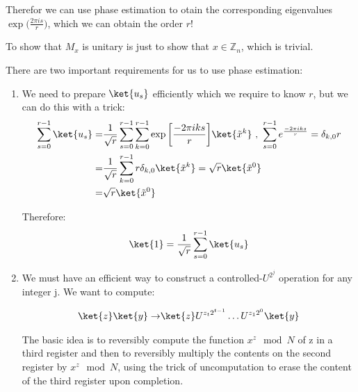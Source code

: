 Therefor we can use phase estimation to otain the corresponding eigenvalues $\exp \big( \frac{2\pi i s}{r} \big)$, which we can obtain the order $r$!

To show that $M_x$ is unitary is just to show that $x \in \mathbb{Z}_n$, which is trivial.

There are two important requirements for us to use phase estimation:
\begin{enumerate}
    \item We need to prepare $\ket{u_s}$ efficiently which we require to know $r$, but we can do this with a trick:
    \begin{equation*}
    \begin{split}
        \sum_{s=0}^{r-1} \ket{u_s} = & \frac{1}{\sqrt{r}} \sum_{s=0}^{r-1} \sum_{k=0}^{r-1} \exp \bigg[ \frac{- 2 \pi i k s}{r} \bigg] \ket{\Tilde{x}^k} \ , \ \sum_{s=0}^{r-1} e^{\frac{-2\pi i k s}{r}} = \delta_{k,0} r \\
        = & \frac{1}{\sqrt{r}} \sum_{k=0}^{r-1} r \delta_{k,0} \ket{\Tilde{x}^k} = \sqrt{r} \ket{\Tilde{x}^0} \\
        = & \sqrt{r} \ket{\Tilde{x}^0}
        \end{split}
    \end{equation*}

    Therefore:
    \begin{equation}
        \ket{1} = \frac{1}{\sqrt{r}} \sum_{s=0}^{r-1} \ket{u_s}
    \end{equation}

    \item We must have an efficient way to construct a controlled-$U^{2^j}$ operation for any integer j. We want to compute:
    
    \begin{equation*}
        \begin{split}
        \ket{z} \ket{y} \rightarrow & \ket{z}U^{z_t 2^{t-1}} \dots U^{z_1 2^{0}} \ket{y} \\
        \end{split}
    \end{equation*}
    
    The basic idea is to reversibly compute the function $x^z \mod N$ of z in a third register and then to reversibly multiply the contents on the second register by $x^z \mod N$, using the trick of uncomputation to erase the content of the third register upon completion.
\end{enumerate}
    
